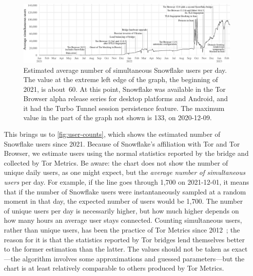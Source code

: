 \documentclass[letterpaper,twocolumn]{article}
\begin{document}
\begin{figure}
\includegraphics{figures/users-global/users-global}
\caption{
Estimated average number of simultaneous Snowflake users per day.
The value at the extreme left edge of the graph,
the beginning of 2021, is about~60.
At this point, Snowflake was available in the Tor Browser alpha release series
for desktop platforms and Android,
and it had the Turbo Tunnel session persistence feature.
The maximum value in the part of the graph not shown
is 133, on \mbox{2020-12-09}.
}
\label{fig:user-counts}
\end{figure}

This brings us to \autoref{fig:user-counts},
which shows the estimated number of Snowflake users since 2021.
Because of Snowflake's affiliation with Tor and Tor Browser,
we estimate users using the normal statistics reported by the bridge
and collected by Tor Metrics.
Be aware: the chart does not show the number of unique daily users,
as one might expect,
but the \emph{average number of simultaneous users} per day.
For example, if the line goes through 1,700 on 2021-12-01,
it means that if the number of Snowflake users were instantaneously sampled
at a random moment in that day, the expected number of users would be 1,700.
The number of unique users per day is necessarily higher,
but how much higher depends on how many hours an average user stays connected.
Counting simultaneous users, rather than unique users,
has been the practice of Tor Metrics since 2012~\cite{tor-tr-2012-10-001};
the reason for it is that the statistics reported by Tor bridges
lend themselves better to the former estimation than the latter.
The values should not be taken as exact---the
algorithm involves some approximations and guessed parameters---but
the chart is at least relatively comparable to others
produced by Tor Metrics.
\end{document}
